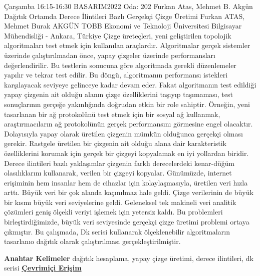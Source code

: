 
    \begin{abstract_basarim}
    {Çarşamba 16:15-16:30}
    {BASARIM2022}
    {Oda: 202}
    {Furkan Atas, Mehmet B. Akgün}
    {Dağıtık Ortamda Derece İlintileri Bazlı Gerçekçi Çizge Üretimi}
    {%
    Furkan ATAS, Mehmet Burak AKGÜN}
    {%
    }
    {%
    TOBB Ekonomi ve Teknoloji Üniversitesi Bilgisayar Mühendisliği - Ankara, Türkiye}
    Çizge üreteçleri, yeni geliştirilen topolojik algoritmaları test etmek için kullanılan araçlardır. Algoritmalar gerçek sistemler üzerinde çalıştırılmadan önce, yapay çizgeler üzerinde performansları değerlendirilir. Bu testlerin sonucuna göre algoritmada gerekli düzenlemeler yapılır ve tekrar test edilir. Bu döngü, algoritmanın performansı istekleri karşılayacak seviyeye gelinceye kadar devam eder. Fakat algoritmanın test edildiği yapay çizgenin ait olduğu alanın çizge özelliklerini taşıyıp taşımaması, test sonuçlarının gerçeğe yakınlığında doğrudan etkin bir role sahiptir. Örneğin, yeni tasarlanan bir ağ protokolünü test etmek için bir sosyal ağ kullanmak, araştırmacıların ağ protokolünün gerçek performansını görmesine engel olacaktır. Dolayısıyla yapay olarak üretilen çizgenin mümkün olduğunca gerçekçi olması gerekir. Rastgele üretilen bir çizgenin ait olduğu alana dair karakteristik özelliklerini korumak için gerçek bir çizgeyi kopyalamak en iyi yollardan biridir. Derece ilintileri bazlı yaklaşımlar çizgenin farklı derecelerdeki kenar-düğüm olasılıklarını kullanarak, verilen bir çizgeyi kopyalar. Günümüzde, internet erişiminin hem insanlar hem de cihazlar için kolaylaşmasıyla, üretilen veri hızla arttı. Büyük veri bir çok alanda kaçınılmaz hale geldi. Çizge verilerinin de büyük bir kısmı büyük veri seviyelerine geldi. Geleneksel tek makineli veri analitik çözümleri geniş ölçekli veriyi işlemek için yetersiz kaldı. Bu problemleri birleştirdiğimizde, büyük veri seviyesinde gerçekçi çizge üretimi problemi ortaya çıkmıştır. Bu çalışmada, Dk serisi kullanarak ölçeklenebilir algoritmaların tasarlanıo dağıtık olarak çalıştırılması gerçekleştirilmiştir. 
    
            \textbf{Anahtar Kelimeler} \newline{}dağıtık hesaplama, yapay çizge üretimi, derece ilintileri, dk serisi
     \newline\newline\noindent \href{https://drive.google.com/file/d/1IqKS_UXObPg5KbBPI44uvgCJgLN1w660/view?usp=drivesdk}{\bfseries Çevrimiçi Erişim}
    \end{abstract_basarim}
    